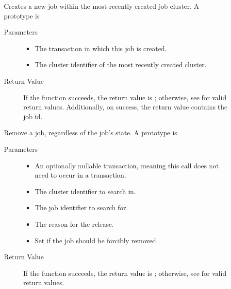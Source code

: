 \begin{description}
\item []
  Creates a new job within the most recently created job cluster.
  A prototype is 


  \begin{description}
    \item[ Parameters]
    \begin{itemize}
      \item {} 
      The transaction in which this job is created.
      \item {} 
      The cluster identifier of the most recently created cluster. 
    \end{itemize}
    \item[ Return Value]
      If the function succeeds, the return value is ; 
      otherwise, see  for valid return values. Additionally,
      on success, the return value contains the job id.
  \end{description}

\item []
  Remove a job, regardless of the job's state.
  A prototype is 


    \begin{description}
    \item[ Parameters]
    \begin{itemize}
      \item {} 
      An optionally nullable transaction, meaning this call does not 
      need to occur in a transaction. 
      \item {} The cluster identifier to search in.
      \item {} The job identifier to search for.
      \item {} The reason for the release.
      \item {}
      Set if the job should be forcibly removed.
    \end{itemize}
    \item[ Return Value]
      If the function succeeds, the return value is ; 
      otherwise, see  for valid return values.
  \end{description}   



\end{description}

